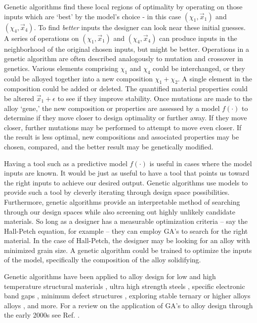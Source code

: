 Genetic algorithms find these local regions of optimality by operating on those inputs which are `best' by the model's choice - in this case $(\chi_1,\vec{x}_1)$ and $(\chi_4,\vec{x}_4)$. To find \textit{better} inputs the designer can look near these initial guesses. A series of operations on $(\chi_1,\vec{x}_1)$ and $(\chi_4,\vec{x}_4)$ can produce inputs in the neighborhood of the original chosen inputs, but might be better. Operations in a genetic algorithm are often described analogously to mutation and crossover in genetics. Various elements comprising $\chi_1$ and $\chi_4$ could be interchanged, or they could be alloyed together into a new composition $\chi_1 + \chi_2$. A single element in the composition could be added or deleted. The quantified material properties could be altered $\vec{x}_1 + \epsilon$ to see if they improve stability. Once mutations are made to the alloy `gene,' the new composition or properties are assessed by a model $f(\cdot)$ to determine if they move closer to design optimality or further away. If they move closer, further mutations may be performed to attempt to move even closer. If the result is less optimal, new compositions and associated properties may be chosen, compared, and the better result may be genetically modified.

Having a tool such as a predictive model $f(\cdot)$ is useful in cases where the model inputs are known. It would be just as useful to have a tool that points us toward the right inputs to achieve our desired output. Genetic algorithms use models to provide such a tool by cleverly iterating through design space possibilities. Furthermore, genetic algorithms provide an interpretable method of searching through our design spaces while also screening out highly unlikely candidate materials. So long as a designer has a measurable optimization criteria -- say the Hall-Petch equation, for example -- they can employ GA's to search for the right material. In the case of Hall-Petch, the designer may be looking for an alloy with minimized grain size. A genetic algorithm could be trained to optimize the inputs of the model, specifically the composition of the alloy solidifying. 

Genetic algorithms have been applied to alloy design for low and high temperature structural materials \cite{Ikeda1997, Kulkarni2004}, ultra high strength steels \cite{Xu2008}, specific electronic band gaps \cite{Dudiy2006}, minimum defect structures \cite{Mousavi2006}, exploring stable ternary or higher alloys alloys \cite{Hautier2010, Johannesson2002}, and more. For a review on the application of GA's to alloy design through the early 2000s see Ref. \cite{Chakraborti2004}.
 

